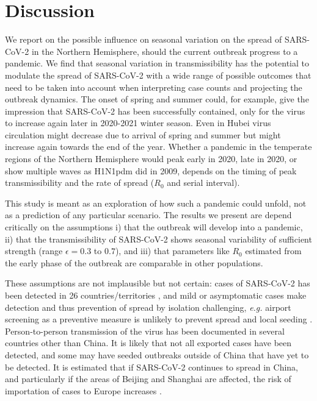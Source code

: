 \documentclass[rmp, reprint, superscriptaddress, floatfix,amsmath]{revtex4-1}
\begin{document}
\section{Discussion}

We report on the possible influence on seasonal variation on the spread of SARS-CoV-2 in the Northern Hemisphere, should the current outbreak progress to a pandemic. We find that seasonal variation in transmissibility has the potential to modulate the spread of SARS-CoV-2 with a wide range of possible outcomes that need to be taken into account when interpreting case counts and projecting the outbreak dynamics. 
The onset of spring and summer could, for example, give the impression that SARS-CoV-2 has been successfully contained, only for the virus to increase again later in 2020-2021 winter season. 
Even in Hubei virus circulation might decrease due to arrival of spring and summer but might increase again towards the end of the year.
Whether a pandemic in the temperate regions of the Northern Hemisphere would peak early in 2020, late in 2020, or show multiple waves as H1N1pdm did in 2009, depends on the timing of peak transmissibility and the rate of spread ($R_0$ and serial interval).

This study is meant as an exploration of how such a pandemic could unfold, not as a prediction of any particular scenario.
The results we present are depend critically on the assumptions
i) that the outbreak will develop into a pandemic,
ii) that the transmissibility of SARS-CoV-2 shows seasonal variability of sufficient strength (range $\epsilon=0.3$ to $0.7$), and  
iii) that parameters like $R_0$ estimated from the early phase of the outbreak are comparable in other populations. 

These assumptions are not implausible but not certain: cases of SARS-CoV-2 has been detected in 26 countries/territories \citep{ECDC_situation_update}, and mild or asymptomatic cases make detection and thus prevention of spread by isolation challenging, \textit{e.g.} airport screening as a preventive measure is unlikely to prevent spread and local seeding \citep{quilty2020effectiveness}. 
Person-to-person transmission of the virus has been documented in several countries other than China. 
It is likely that not all exported cases have been detected, and some may have seeded outbreaks outside of China that have yet to be detected. It is estimated that if SARS-CoV-2 continues to spread in China, and particularly if the areas of Beijing and Shanghai are affected, the risk of importation of cases to Europe increases \citep{pullano2020novel}.
\end{document}
